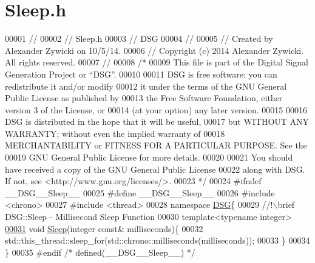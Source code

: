 \hypertarget{_sleep_8h_source}{\section{Sleep.\+h}
\label{_sleep_8h_source}
}

\begin{DoxyCode}
00001 \textcolor{comment}{//}
00002 \textcolor{comment}{//  Sleep.h}
00003 \textcolor{comment}{//  DSG}
00004 \textcolor{comment}{//}
00005 \textcolor{comment}{//  Created by Alexander Zywicki on 10/5/14.}
00006 \textcolor{comment}{//  Copyright (c) 2014 Alexander Zywicki. All rights reserved.}
00007 \textcolor{comment}{//}
00008 \textcolor{comment}{/*}
00009 \textcolor{comment}{ This file is part of the Digital Signal Generation Project or “DSG”.}
00010 \textcolor{comment}{}
00011 \textcolor{comment}{ DSG is free software: you can redistribute it and/or modify}
00012 \textcolor{comment}{ it under the terms of the GNU General Public License as published by}
00013 \textcolor{comment}{ the Free Software Foundation, either version 3 of the License, or}
00014 \textcolor{comment}{ (at your option) any later version.}
00015 \textcolor{comment}{}
00016 \textcolor{comment}{ DSG is distributed in the hope that it will be useful,}
00017 \textcolor{comment}{ but WITHOUT ANY WARRANTY; without even the implied warranty of}
00018 \textcolor{comment}{ MERCHANTABILITY or FITNESS FOR A PARTICULAR PURPOSE.  See the}
00019 \textcolor{comment}{ GNU General Public License for more details.}
00020 \textcolor{comment}{}
00021 \textcolor{comment}{ You should have received a copy of the GNU General Public License}
00022 \textcolor{comment}{ along with DSG.  If not, see <http://www.gnu.org/licenses/>.}
00023 \textcolor{comment}{ */}
00024 \textcolor{preprocessor}{#ifndef \_\_DSG\_\_Sleep\_\_}
00025 \textcolor{preprocessor}{#define \_\_DSG\_\_Sleep\_\_}
00026 \textcolor{preprocessor}{#include <chrono>}
00027 \textcolor{preprocessor}{#include <thread>}
00028 \textcolor{keyword}{namespace }\hyperlink{namespace_d_s_g}{DSG}\{\textcolor{comment}{}
00029 \textcolor{comment}{    //!\(\backslash\)brief DSG::Sleep - Millisecond Sleep Function}
00030 \textcolor{comment}{}    \textcolor{keyword}{template}<\textcolor{keyword}{typename} \textcolor{keywordtype}{int}eger>
\hypertarget{_sleep_8h_source_l00031}{}\hyperlink{namespace_d_s_g_a012c968132bda114752f8ae012a1f441}{00031}     \textcolor{keywordtype}{void} \hyperlink{namespace_d_s_g_a012c968132bda114752f8ae012a1f441}{Sleep}(integer \textcolor{keyword}{const}& milliseconds)\{
00032         std::this\_thread::sleep\_for(std::chrono::milliseconds(milliseconds));
00033     \}
00034 \}
00035 \textcolor{preprocessor}{#endif }\textcolor{comment}{/* defined(\_\_DSG\_\_Sleep\_\_) */}\textcolor{preprocessor}{}
\end{DoxyCode}

